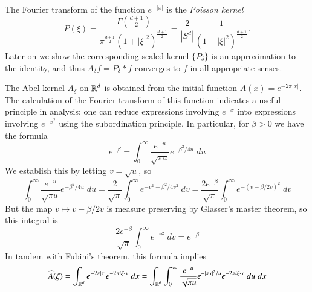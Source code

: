 \begin{example}
    The Fourier transform of the function $e^{- |x|}$ is the \emph{Poisson kernel}
    \[ P(\xi) = \frac{\Gamma \left( \frac{d+1}{2} \right)}{\pi^{\frac{d+1}{2}} (1 + |\xi|^2)^{\frac{d+1}{2}}} = \frac{2}{|S^d|} \frac{1}{(1 + |\xi|^2)^{\frac{d+1}{2}}}. \]
    Later on we show the corresponding scaled kernel $\{ P_\delta \}$ is an approximation to the identity, and thus $A_\delta f = P_\delta * f$ converges to $f$ in all appropriate senses.

    The Abel kernel $A_\delta$ on $\operatorname{\mathbb{R}}^d$ is obtained from the initial function $A(x) = e^{-2 \pi |x|}$. The calculation of the Fourier transform of this function indicates a useful principle in analysis: one can reduce expressions involving $e^{-x}$ into expressions involving $e^{-x^2}$ using the subordination principle. In particular, for $\beta > 0$ we have the formula
    \[ e^{-\beta} = \int_0^\infty \frac{e^{-u}}{\sqrt{\pi u}} e^{-\beta^2/4u}\; du \]
    We establish this by letting $v = \sqrt{u}$, so
    \[ \int_0^\infty \frac{e^{-u}}{\sqrt{\pi u}} e^{-\beta^2/4u}\; du = \frac{2}{\sqrt{\pi}} \int_0^\infty e^{-v^2 - \beta^2/4v^2}\; dv = \frac{2e^{-\beta}}{\sqrt{\pi}} \int_0^\infty e^{-(v - \beta/2v)^2}\; dv \]
    But the map $v \mapsto v - \beta/2v$ is measure preserving by Glasser's master theorem, so this integral is
    \[ \frac{2e^{-\beta}}{\sqrt{\pi}} \int_0^\infty e^{-v^2}\; dv = e^{-\beta} \]
    In tandem with Fubini's theorem, this formula implies
    \begin{align*}
        \widehat{A}(\xi) &= \int_{\RR^d} e^{-2 \pi |x|} e^{- 2 \pi i \xi \cdot x}\; dx = \int_{\RR^d} \int_0^\infty \frac{e^{-u}}{\sqrt{\pi u}} e^{- |\pi x|^2/u} e^{-2 \pi i \xi \cdot x}\; du\; dx\\

\end{align*}
\end{example}

